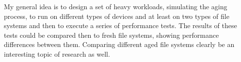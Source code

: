 \documentclass[color]{fithesis3}
\begin{document}
My general idea is to design a set of heavy workloads, simulating the aging process, to run on different types of devices and at least on two types of file systems and then to execute a series of performance tests. The results of these tests could be compared then to fresh file systems, showing performance differences between them. Comparing different aged file systems clearly be an interesting topic of research as well.




\end{document}
